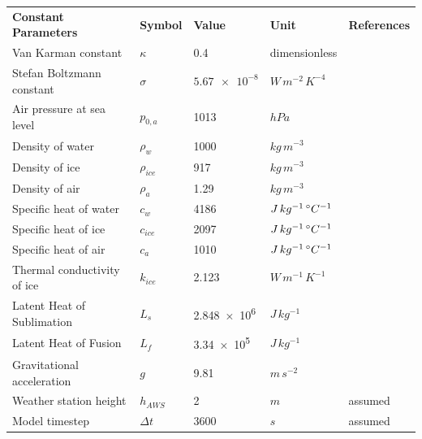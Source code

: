 \documentclass[tc, manuscript]{copernicus}
\begin{document}
\begin{table}
\begin{tabular}{lllll}
		\textbf{Constant Parameters}                       & \textbf{Symbol} & \textbf{Value} &
    \textbf{Unit} & \textbf{References} \\
    Van Karman constant & $\kappa$      & 0.4        &dimensionless & \citet{cuffeyPhysicsGlaciers2010}              \\
    Stefan Boltzmann constant & $\sigma$ & $\num{5.67 e-8} $& $W\, m^{-2}\, K^{-4}$ & \citet{cuffeyPhysicsGlaciers2010}\\
    Air pressure at sea level & $p_{0,a}$ & 1013 & $hPa$  & \citet{molgAblationAssociatedEnergy2004}\\
    Density of water & $\rho_{w}$ & 1000 & $kg\, m^{-3}$    & \citet{cuffeyPhysicsGlaciers2010}\\
    Density of ice & $\rho_{ice}$ & 917 & $kg\, m^{-3}$ & \citet{cuffeyPhysicsGlaciers2010}\\
    Density of air & $\rho_{a}$ &  1.29 & $kg\, m^{-3}$   & \citet{molgAblationAssociatedEnergy2004}\\
    Specific heat of water & $c_{w}$ & 4186 & $J\, kg^{-1}\,^{\circ} C^{-1}$  & \citet{cuffeyPhysicsGlaciers2010}\\
    Specific heat of ice & $c_{ice}$ & 2097 & $J\, kg^{-1}\,^{\circ} C^{-1}$ & \citet{cuffeyPhysicsGlaciers2010}\\
    Specific heat of air & $c_{a}$ & 1010 & $J\, kg^{-1}\,^{\circ} C^{-1}$ & \citet{molgAblationAssociatedEnergy2004}\\
    Thermal conductivity of ice & $k_{ice}$ & 2.123  & $W\, m^{-1}\, K^{-1}$ & \citet{bonalesThermalConductivityIce2017} \\
    Latent Heat of Sublimation & $L_{s}$ & \num{2.848e6}  & $J\, kg^{-1}$ &   \citet{cuffeyPhysicsGlaciers2010}\\
    Latent Heat of Fusion & $L_{f}$ & \num{3.34e5} & $J\, kg^{-1}$ & \citet{cuffeyPhysicsGlaciers2010}\\
    Gravitational acceleration & $g$ & 9.81 & $m\, s^{-2}$ &\citet{cuffeyPhysicsGlaciers2010}\\
    Weather station height & $h_{AWS}$ & 2 & $m$ & assumed \\
    Model timestep                            & $\Delta t$            & $3600$           & $s$ & assumed \\\midrule


\end{tabular}
\end{table}
\end{document}
